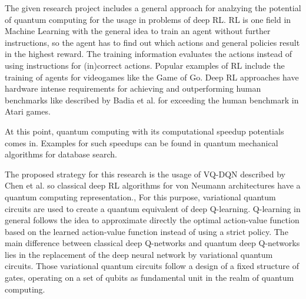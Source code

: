 The given research project includes a general approach for analzying the potential of quantum computing for the usage in problems of deep \ac{RL}. 
\ac{RL} is one field in Machine Learning with the general idea to train an agent without further instructions, so the agent has to find out which actions and general policies result in the highest reward. 
The training information evaluates the actions instead of using instructions for (in)correct actions.
Popular examples of \ac{RL} include the training of agents for videogames like the Game of Go.\autocite{rl}
Deep \ac{RL} approaches have hardware intense requirements for achieving and outperforming human benchmarks like described by Badia et al. for exceeding the human benchmark in Atari games.\autocite{atari}


At this point, quantum computing with its computational speedup potentials comes in.
Examples for such speedups can be found in quantum mechanical algorithms for database search\autocite{databasesearch}. 


The proposed strategy for this research is the usage of \ac{VQ-DQN} described by Chen et al. so classical deep \ac{RL} algorithms for von Neumann architectures have a quantum computing representation.\autocite{vqdqn},
For this purpose, variational quantum circuits are used to create a quantum equivalent of deep Q-learning.
Q-learning in general follows the idea to approximate directly the optimal action-value function based on the learned action-value function instead of using a strict policy.\autocite{rl}
The main difference between classical deep Q-networks and quantum deep Q-networks lies in the replacement of the deep neural network by variational quantum circuits.
Those variational quantum circuits follow a design of a fixed structure of gates, operating on a set of qubits as fundamental unit in the realm of quantum computing.\autocite{circuits}


